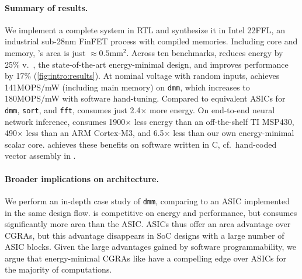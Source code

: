 
\figRipTideIntroResults
\paragraph{Summary of results.}
%
We implement a complete \riptide system in RTL and synthesize it in
Intel 22FFL, an industrial sub-28nm FinFET process with compiled memories.
%
Including core and memory, \riptide's area is just $\approx 0.5$mm$^2$.
%
Across ten benchmarks, \riptide reduces energy by
25\% v.\ \snafu, the state-of-the-art energy-minimal design,
and improves performance by 17\% (\autoref{fig:intro:results}).
%
At nominal voltage with random inputs, \riptide achieves 141MOPS/mW (including main memory) on {\tt dmm},
which increases to 180MOPS/mW with software hand-tuning.
%
Compared to equivalent ASICs for {\tt dmm}, {\tt sort}, and {\tt fft},
\riptide consumes just 2.4$\times$ more energy.
%
% 
On end-to-end neural network inference,
\riptide consumes 1900$\times$ less energy than an off-the-shelf TI MSP430,
490$\times$ less than an ARM Cortex-M3,
and 6.5$\times$ less than our own energy-minimal scalar core.
%
\riptide achieves these benefits on software written in C,
cf.\ hand-coded vector assembly in \snafu.

\paragraph{Broader implications on architecture.}

We perform an in-depth case study of {\tt dmm},
comparing \riptide to an ASIC implemented in the same
design flow. \riptide is competitive on energy and performance, but
consumes significantly more area than the ASIC.
%
ASICs thus offer an area advantage over CGRAs, but this advantage
disappears in SoC designs with a large number of ASIC blocks. Given
the large advantages gained by software programmability, we argue that
energy-minimal CGRAs like \riptide have a compelling edge over ASICs for
the majority of computations.

